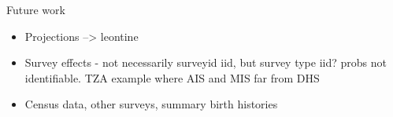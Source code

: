 \documentclass[ignorenonframetext,]{beamer}
\providecommand{\tightlist}{%
  \setlength{\itemsep}{0pt}\setlength{\parskip}{0pt}}
\begin{document}
\begin{frame}{Future work}
\protect\hypertarget{future-work}{}

\begin{itemize}
\tightlist
\item
  Projections --\textgreater{} leontine
\item
  Survey effects - not necessarily surveyid iid, but survey type iid?
  probs not identifiable. TZA example where AIS and MIS far from DHS
\item
  Census data, other surveys, summary birth histories
\end{itemize}

\end{frame}
\end{document}
